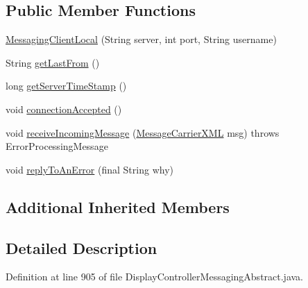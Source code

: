 \subsection*{Public Member Functions}
\begin{DoxyCompactItemize}
\item 
\hyperlink{classgov_1_1fnal_1_1ppd_1_1dd_1_1display_1_1client_1_1DisplayControllerMessagingAbstract_1_1MessagingClientLocal_aab5055217ae02ff553cf3e5f084a607e}{Messaging\-Client\-Local} (String server, int port, String username)
\item 
String \hyperlink{classgov_1_1fnal_1_1ppd_1_1dd_1_1display_1_1client_1_1DisplayControllerMessagingAbstract_1_1MessagingClientLocal_a9a193015aabc39d3b5492b0c337b4376}{get\-Last\-From} ()
\item 
long \hyperlink{classgov_1_1fnal_1_1ppd_1_1dd_1_1display_1_1client_1_1DisplayControllerMessagingAbstract_1_1MessagingClientLocal_a767cb79358df8e50da15ad8f6cc00cf4}{get\-Server\-Time\-Stamp} ()
\item 
void \hyperlink{classgov_1_1fnal_1_1ppd_1_1dd_1_1display_1_1client_1_1DisplayControllerMessagingAbstract_1_1MessagingClientLocal_abcadb8c8fa8f72b2f6a03e486e1a8dc3}{connection\-Accepted} ()
\item 
void \hyperlink{classgov_1_1fnal_1_1ppd_1_1dd_1_1display_1_1client_1_1DisplayControllerMessagingAbstract_1_1MessagingClientLocal_a259fb401595d4b323303f6d03746467f}{receive\-Incoming\-Message} (\hyperlink{classgov_1_1fnal_1_1ppd_1_1dd_1_1xml_1_1MessageCarrierXML}{Message\-Carrier\-X\-M\-L} msg)  throws Error\-Processing\-Message 
\item 
void \hyperlink{classgov_1_1fnal_1_1ppd_1_1dd_1_1display_1_1client_1_1DisplayControllerMessagingAbstract_1_1MessagingClientLocal_a4d746696e272fa4253a59369f434eb92}{reply\-To\-An\-Error} (final String why)
\end{DoxyCompactItemize}
\subsection*{Additional Inherited Members}


\subsection{Detailed Description}


Definition at line 905 of file Display\-Controller\-Messaging\-Abstract.\-java.



